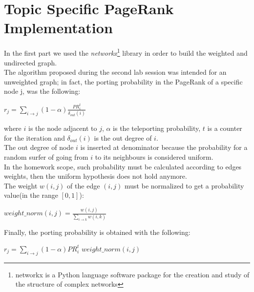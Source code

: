 \documentclass[11pt]{article}
\begin{document}
\section{Topic Specific PageRank Implementation}
In the first part we used the \textit{networkx}\footnote{networkx is a Python language software package for the creation
and study of the structure of complex networks} library in order to build the weighted and undirected graph.\\
The algorithm proposed during the second lab session was intended for an unweighted graph; in fact, the porting probability in the PageRank of a specific node j, was the following:\\
\begin{center}
$ r_j =\sum_{i\rightarrow j}(1-\alpha) \frac{PR_{i}^{t}}{\delta_{out}(i)}$
\end{center}
where $i$ is the node adjacent to $j$, $\alpha$ is the teleporting probability, $t$ is a counter for the
iteration and $\delta_{out}(i)$ is the out degree of $i$.\\
The out degree of node $i$ is inserted at denominator because the probability for a random surfer
of going from $i$ to its neighbours is considered uniform.\\
In the homework scope, such probability must be calculated according to edges weights, then
the uniform hypothesis does not hold anymore.\\
The weight $w(i,j)$ of the edge $(i,j)$ must be normalized to get a probability value(in the
range $[0,1]$):\\
\begin{center}
$weight\_norm(i,j) = \frac{w(i,j)}{\sum_{i\rightarrow k}w(i,k)}$\\
\end{center}
Finally, the porting probability is obtained with the following:\\
\begin{center}
$ r_j =\sum_{i\rightarrow j}(1-\alpha)PR_{i}^{t}$ $weight\_norm(i,j)$\\
\end{center}
\end{document}

